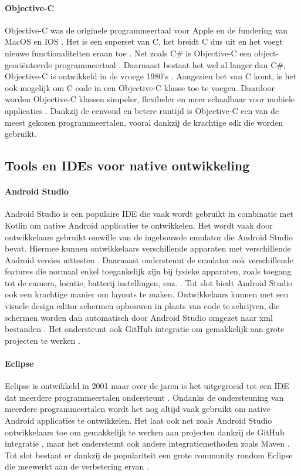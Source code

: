 \paragraph{Objective-C}
Objective-C was de originele programmeertaal voor Apple en de fundering van MacOS en 
IOS \autocite{Johns2023}. Het is een \gls{superset} van C, het breidt C dus uit en het 
voegt nieuwe functionaliteiten eraan toe \autocite{Johns2023}. Net zoals C\# is Objective-C 
een object-georiënteerde programmeertaal \autocite{Pruciak2022}. Daarnaast bestaat 
het wel al langer dan C\#, Objective-C is ontwikkeld in de vroege 1980's \autocite{Pruciak2022}. 
Aangezien het van C komt, is het ook mogelijk om C code in een Objective-C klasse toe 
te voegen. Daardoor worden Objective-C klassen simpeler, flexibeler en meer schaalbaar 
voor mobiele applicaties \autocite{yuvraj2022}. Dankzij de eenvoud en betere runtijd is 
Objective-C een van de meest gekozen programmeertalen, vooral dankzij de krachtige \acrshort{sdk} 
die worden gebruikt.

\subsection{Tools en IDEs voor native ontwikkeling}
\paragraph{Android Studio}
Android Studio is een populaire IDE die vaak wordt gebruikt in combinatie met 
Kotlin om native Android applicaties te ontwikkelen. Het wordt vaak door ontwikkelaars 
gebruikt omwille van de ingebouwde \gls{emulator} die Android Studio bevat. Hiermee 
kunnen ontwikkelaars verschillende apparaten met verschillende Android versies uittesten 
\autocite{Medewar2022}. Daarnaast ondersteunt de emulator ook verschillende 
features die normaal enkel toegankelijk zijn bij fysieke apparaten, zoals toegang tot 
de camera, locatie, batterij instellingen, enz. \autocite{Okeke2022}. Tot slot biedt 
Android Studio ook een krachtige manier om layouts te maken. Ontwikkelaars kunnen met 
een visuele design editor schermen opbouwen in plaats van code te schrijven, die schermen 
worden dan automatisch door Android Studio omgezet naar xml bestanden \autocite{Medewar2022}. 
Het ondersteunt ook GitHub integratie om gemakkelijk aan grote projecten te werken \autocite{Studio2023}.

\paragraph{Eclipse}
Eclipse is ontwikkeld in 2001 maar over de jaren is het uitgegroeid 
tot een IDE dat meerdere programmeertalen ondersteunt \autocite{Medewar2022}. Ondanks 
de ondersteuning van meerdere programmeertalen wordt het nog altijd vaak gebruikt om native 
Android applicaties te ontwikkelen. Het laat ook net zoals Android Studio ontwikkelaars toe 
om gemakkelijk te werken aan projecten dankzij de GitHub integratie \autocite{Okeke2022}, maar 
het ondersteunt ook andere integratiemethoden zoals Maven \autocite{Medewar2022}. Tot slot 
bestaat er dankzij de populariteit een grote community rondom Eclipse die meewerkt aan de 
verbetering ervan \autocite{Medewar2022}.

